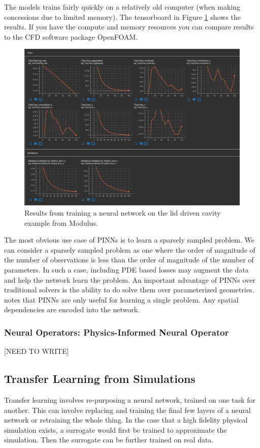 \documentclass[]{article}
\begin{document}
The models trains fairly quickly on a relatively old computer (when making concessions due to limited memory).  The tensorboard in Figure \ref{fig:screenshot-2022-05-09-at-17-19-07-tensorboard} shows the results.  If you have the compute and memory resources you can compare results to the CFD software package OpenFOAM.
\begin{figure}
	\centering
	\includegraphics[width=0.7\linewidth]{"images/Screenshot 2022-05-09 at 17-19-07 TensorBoard"}
	\caption[ldc_results]{Results from training a neural network on the lid driven cavity example from Modulus.}
	\label{fig:screenshot-2022-05-09-at-17-19-07-tensorboard}
\end{figure}

The most obvious use case of PINNs is to learn a sparsely sampled problem.  We can consider a sparsely sampled problem as one where the order of magnitude of the number of observations is less than the order of magnitude of the number of parameters.  In such a case, including PDE based losses may augment the data and help the network learn the problem.  An important advantage of PINNs over traditional solvers is the ability to do solve them over parameterized geometries.  \cite{neural_operators} notes that PINNs are only useful for learning a single problem.  Any spatial dependencies are encoded into the network.

\subsubsection{Neural Operators: Physics-Informed Neural Operator}
[NEED TO WRITE]

\subsection{Transfer Learning from Simulations}
Transfer learning involves re-purposing a neural network, trained on one task for another.  This can involve replacing and training the final few layers of a neural network or retraining the whole thing.  In the case that a high fidelity physical simulation exists, a surrogate would first be trained to approximate the simulation.  Then the surrogate can be further trained on real data.  
\end{document}
